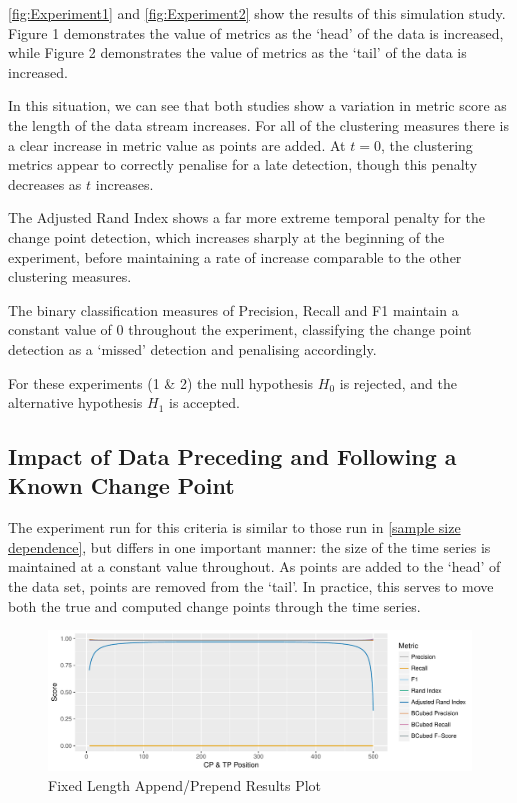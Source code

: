 \documentclass{uvamscse}	%
\begin{document}
\autoref{fig:Experiment1} and \autoref{fig:Experiment2} show the results of this simulation study. Figure 1 demonstrates the value of metrics as the `head' of the data is increased, while Figure 2 demonstrates the value of metrics as the `tail' of the data is increased.

In this situation, we can see that both studies show a variation in metric score as the length of the data stream increases. For all of the clustering measures there is a clear increase in metric value as points are added. At $t=0$, the clustering metrics appear to correctly penalise for a late detection, though this penalty decreases as $t$ increases.

The Adjusted Rand Index shows a far more extreme temporal penalty for the change point detection, which increases sharply at the beginning of the experiment, before maintaining a rate of increase comparable to the other clustering measures.

The binary classification measures of Precision, Recall and F1 maintain a constant value of $0$ throughout the experiment, classifying the change point detection as a `missed' detection and penalising accordingly.

For these experiments (1 \& 2) the null hypothesis $H_0$ is rejected, and the alternative hypothesis $H_1$ is accepted.

\subsection{Impact of Data Preceding and Following a Known Change Point}

The experiment run for this criteria is similar to those run in \autoref{sample size dependence}, but differs in one important manner: the size of the time series is maintained at a constant value throughout. As points are added to the `head' of the data set, points are removed from the `tail'. In practice, this serves to move both the true and computed change points through the time series.

\begin{figure}[h]
    \includegraphics[width=\textwidth]{figures/Experiment2}
    \caption{Fixed Length Append/Prepend Results Plot}
    \label{fig:Experiment3}
\end{figure}
\end{document}
